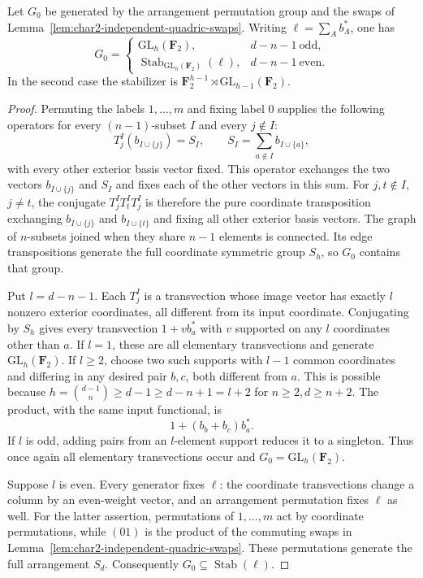 \begin{lemma}\label{lem:char2-coordinate-generation}
Let $G_0$ be generated by the arrangement permutation group
and the swaps of Lemma~\ref{lem:char2-independent-quadric-swaps}.
Writing $\ell=\sum_A b_A^*$, one has
\[
 G_0=
 \begin{cases}
 \mathrm{GL}_{h}(\mathbf F_2),&d-n-1\ \text{odd},\\
 \operatorname{Stab}_{\mathrm{GL}_h(\mathbf F_2)}(\ell),
       &d-n-1\ \text{even}.
 \end{cases}
\]
In the second case the stabilizer is
$\mathbf F_2^{h-1}\rtimes\mathrm{GL}_{h-1}(\mathbf F_2)$.
\end{lemma}

\begin{proof}
Permuting the labels $1,\ldots,m$ and fixing label $0$ supplies
the following operators for every $(n-1)$-subset $I$ and
every $j\notin I$:
\[
 T^I_j(b_{I\cup\{j\}})=S_I,\qquad
 S_I=\sum_{a\notin I}b_{I\cup\{a\}},
\]
with every other exterior basis vector fixed.  This operator
exchanges the two vectors $b_{I\cup\{j\}}$ and $S_I$ and
fixes each of the other vectors in this sum.
For $j,t\notin I$, $j\ne t$, the conjugate
$T^I_jT^I_tT^I_j$ is therefore the pure coordinate
transposition exchanging $b_{I\cup\{j\}}$ and
$b_{I\cup\{t\}}$ and fixing all other exterior basis vectors.
The graph of $n$-subsets joined when they share $n-1$ elements
is connected.  Its edge transpositions generate the full
coordinate symmetric group $S_h$, so $G_0$ contains that group.

Put $l=d-n-1$.  Each $T^I_j$ is a transvection whose image
vector has exactly $l$ nonzero exterior coordinates, all
different from its input coordinate.  Conjugating by $S_h$
gives every transvection
$1+v b_a^*$ with $v$ supported on any $l$ coordinates other
than $a$.  If $l=1$, these are all elementary transvections
and generate $\mathrm{GL}_h(\mathbf F_2)$.
If $l\geq2$, choose two such supports with $l-1$ common
coordinates and differing in any desired pair $b,c$, both
different from $a$.  This is possible because
$h=\binom{d-1}{n}\geq d-1\geq d-n+1=l+2$
for $n\geq2,d\geq n+2$.
The product, with the same input functional, is
\[
 1+(b_b+b_c)b_a^*.
 \tag{4}
\]
If $l$ is odd, adding pairs from an $l$-element support reduces
it to a singleton.  Thus once again all elementary
transvections occur and $G_0=\mathrm{GL}_h(\mathbf F_2)$.

Suppose $l$ is even.  Every generator fixes $\ell$:
the coordinate transvections change a column by an even-weight
vector, and an arrangement permutation fixes $\ell$ as well.
For the latter assertion, permutations of $1,\ldots,m$ act
by coordinate permutations, while $(01)$ is the product of
the commuting swaps in
Lemma~\ref{lem:char2-independent-quadric-swaps}.
These permutations generate the full arrangement $S_d$.
Consequently $G_0\subseteq\operatorname{Stab}(\ell)$.


\end{proof}
